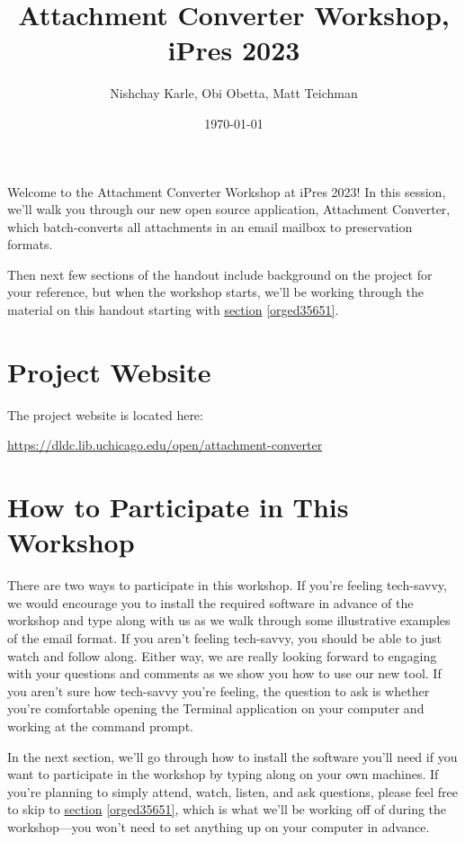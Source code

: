 \documentclass[11pt]{article}
\author{Nishchay Karle, Obi Obetta, Matt Teichman}
\date{\today}
\title{Attachment Converter Workshop, iPres 2023}
\begin{document}
\maketitle
Welcome to the Attachment Converter Workshop at iPres 2023!  In this
session, we'll walk you through our new open source application,
Attachment Converter, which batch-converts all attachments in an email
mailbox to preservation formats.

Then next few sections of the handout include background on the
project for your reference, but when the workshop starts, we'll be
working through the material on this handout starting with \hyperref[orged35651]{section}
\ref{orged35651}.

\section{Project Website}
\label{sec:orgbc52658}

The project website is located here:

\url{https://dldc.lib.uchicago.edu/open/attachment-converter}


\section{How to Participate in This Workshop}
\label{sec:orgd4da746}

There are two ways to participate in this workshop.  If you're feeling
tech-savvy, we would encourage you to install the required software in
advance of the workshop and type along with us as we walk through some
illustrative examples of the email format.  If you aren't feeling
tech-savvy, you should be able to just watch and follow along.  Either
way, we are really looking forward to engaging with your questions and
comments as we show you how to use our new tool. If you aren't sure
how tech-savvy you're feeling, the question to ask is whether you're
comfortable opening the Terminal application on your computer and
working at the command prompt.

In the next section, we'll go through how to install the software
you'll need if you want to participate in the workshop by typing along
on your own machines.  If you're planning to simply attend, watch,
listen, and ask questions, please feel free to skip to \hyperref[orged35651]{section}
\ref{orged35651}, which is what we'll be working off of during the
workshop---you won't need to set anything up on your computer in
advance.
\end{document}

